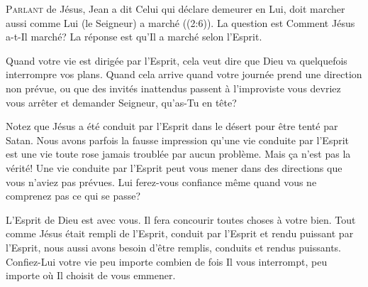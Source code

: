 

\lettrine{P}{arlant} de Jésus, Jean a dit\frcolon{} 
 \Og Celui qui déclare demeurer en Lui, doit marcher aussi comme Lui
 (le Seigneur) a marché \Fg{} ((2:6)). 
 La question est\frcolon{}  \Og Comment Jésus a-t-Il marché? \Fg{}
 La réponse est qu'Il a marché selon l'Esprit. 

Quand votre vie est dirigée par l'Esprit, cela veut dire que Dieu
 va quelquefois interrompre vos plans. Quand cela arrive
 \ocadr quand votre journée prend une direction non prévue,
 ou que des invités inattendus passent à l'improviste \fcadr{}
 vous devriez vous arrêter et demander\frcolon{} 
 \Og Seigneur, qu'as-Tu en tête? \Fg{} 


Notez que Jésus a été conduit par l'Esprit dans le désert pour être tenté
 par Satan. Nous avons parfois la fausse impression qu'une vie conduite
 par l'Esprit est une vie toute rose jamais troublée par aucun problème.
 Mais \c{c}a n'est pas la vérité! Une vie conduite par l'Esprit
 peut vous mener dans des directions que vous n'aviez pas prévues.
 Lui ferez-vous confiance même quand vous ne comprenez pas
 ce qui se passe?

L'Esprit de Dieu est avec vous. Il fera concourir toutes choses à votre bien.
 Tout comme Jésus était rempli de l'Esprit, conduit par l'Esprit
 et rendu puissant par l'Esprit, nous aussi avons besoin d'être remplis,
 conduits et rendus puissants. Confiez-Lui votre vie
 \ocadr peu importe combien de fois Il vous interrompt,
 peu importe où Il choisit de vous emmener.

\dvrule





